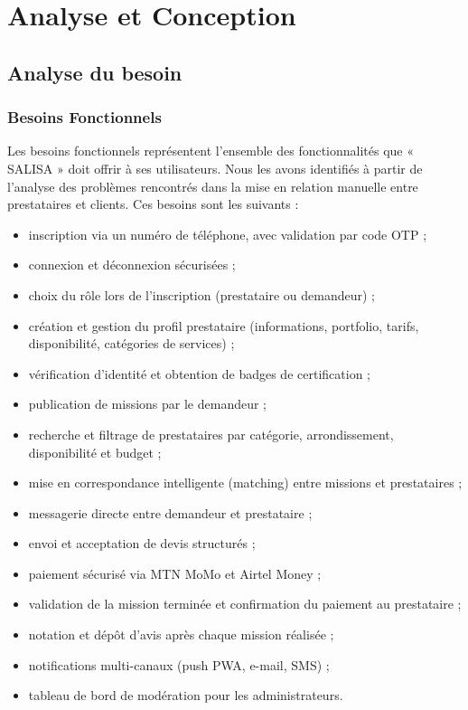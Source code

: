 \chapter{Analyse et Conception}
\pagestyle{styleGlobal}
\label{chap:analyse_conception}

\section{Analyse du besoin}

\subsection{Besoins Fonctionnels}

Les besoins fonctionnels représentent l'ensemble des fonctionnalités que « SALISA » doit offrir à ses utilisateurs. Nous les avons identifiés à partir de l'analyse des problèmes rencontrés dans la mise en relation manuelle entre prestataires et clients. Ces besoins sont les suivants :

\begin{itemize}[label=\textbf{-}]
	\item inscription via un numéro de téléphone, avec validation par code OTP ;
	\item connexion et déconnexion sécurisées ;
	\item choix du rôle lors de l'inscription (prestataire ou demandeur) ;
	\item création et gestion du profil prestataire (informations, portfolio, tarifs, disponibilité, catégories de services) ;
	\item vérification d'identité et obtention de badges de certification ;
	\item publication de missions par le demandeur ;
	\item recherche et filtrage de prestataires par catégorie, arrondissement, disponibilité et budget ;
	\item mise en correspondance intelligente (matching) entre missions et prestataires ;
	\item messagerie directe entre demandeur et prestataire ;
	\item envoi et acceptation de devis structurés ;
	\item paiement sécurisé via MTN MoMo et Airtel Money \cite{mtn_momo} ;
	\item validation de la mission terminée et confirmation du paiement au prestataire ;
	\item notation et dépôt d'avis après chaque mission réalisée ;
	\item notifications multi-canaux (push PWA, e-mail, SMS) ;
	\item tableau de bord de modération pour les administrateurs.
\end{itemize}

